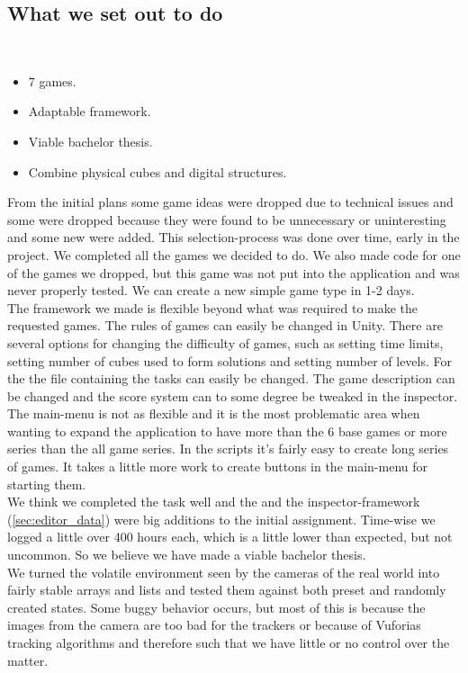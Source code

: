 \subsection{What we set out to do}

\begin{description}
	\item {}

	\item[Result goals]\ 
	\begin{itemize}
		\item 7 games.
		\item Adaptable framework.
		\item Viable bachelor thesis.
		\item Combine physical cubes and digital structures.
	\end{itemize}
	From the initial plans some game ideas were dropped due to technical issues and some were dropped because they were found to be unnecessary or uninteresting and some new were added. 
	This selection-process was done over time, early in the project. We completed all the games we decided to do. 
	We also made code for one of the games we dropped, but this game was not put into the application and was never properly tested. 
	We can create a new simple game type in 1-2 days.\\
	The framework we made is flexible beyond what was required to make the requested games. 
	The rules of games can easily be changed in Unity. 
	There are several options for changing the difficulty of games, such as setting time limits, setting number of cubes used to form solutions and setting number of levels. 
	For the \nameref{game:wo0ord_game} the file containing the tasks can easily be changed. 
	The game description can be changed and the score system can to some degree be tweaked in the inspector. 
	The main-menu is not as flexible and it is the most problematic area when wanting to expand the application to have more than the 6 base games or more series than the all game series. 
	In the scripts it's fairly easy to create long series of games. It takes a little more work to create buttons in the main-menu for starting them.\\
	We think we completed the task well and the \nameref{game:wo0ord_game} and the inspector-framework (\ref{sec:editor_data}) were big additions to the initial assignment. Time-wise we logged a little over 400 hours each, which is a little lower than expected, but not uncommon. So we believe we have made a viable bachelor thesis.\\
	We turned the volatile environment seen by the cameras of the real world
	into fairly stable arrays and lists and tested them against both preset 
	and randomly created states. Some buggy behavior occurs, but most of this
	is because the images from the camera are too bad for the trackers or because
	of Vuforias tracking algorithms and therefore such that we have little or no control over the matter.\\


\end{description}
